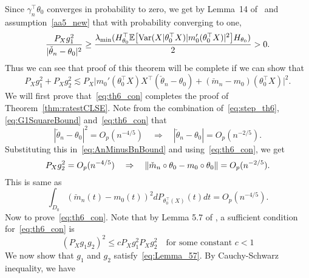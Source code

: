 Since $\gamma_n^{\top}\theta_0$ converges in probability to zero, we get by Lemma~14 of~\cite{Patra16} and assumption~\ref{aa5_new} that with probability converging to one,
\begin{equation}\label{eq:G1SquareBound}
\frac{P_Xg_1^2}{|\check{\theta}_n - \theta_0|^2} \ge \frac{\lambda_{\min}(H_{\theta_0}^\top\mathbb{E}\big[\mathrm{Var}(X|\theta_0^\top X) |m_0'(\theta_0^{\top}X)|^2\big] H_{\theta_0})}{2} > 0.
\end{equation}
Thus we can see that proof of this theorem will be complete if we can show that
\begin{equation}\label{eq:th6_con}
P_X g_1^2 +P_X g_2^2 \lesssim  P_X\big|m_0'(\theta_0^{\top}X)X^{\top}(\check{\theta}_n - \theta_0) + (\check{m}_n - m_0)(\theta_0^{\top}X)\big|^2.
\end{equation}
We will first prove that~\eqref{eq:th6_con} completes the proof of Theorem~\ref{thm:ratestCLSE}. Note from the combination of~\eqref{eq:step_th6}, \eqref{eq:G1SquareBound} and~\eqref{eq:th6_con} that
\[
|\check{\theta}_n - \theta_0|^2 = O_p(n^{-4/5})\quad\Rightarrow\quad |\check{\theta}_n - \theta_0| = O_p(n^{-2/5}).
\]
Substituting this in~\eqref{eq:AnMinusBnBound} and using~\eqref{eq:th6_con}, we get
\[
P_Xg_2^2 = O_p(n^{-4/5})\quad\Rightarrow\quad \left\lVert\check{m}_n\circ\theta_0 - m_0\circ\theta_0\right\rVert = O_p(n^{-2/5}).
\]
This is same as
\begin{equation}\label{eq:IntegralFtheta_0}
\int_{D_0} \left(\check{m}_n(t) - m_0(t)\right)^2dP_{\theta_0^{\top}(X)}(t) dt = O_p(n^{-4/5}).
\end{equation}
Now to prove~\eqref{eq:th6_con}. Note that by Lemma 5.7 of \cite{VANC}, a sufficient condition for~\eqref{eq:th6_con} is 
\begin{equation}\label{eq:Lemma_57}
({P}_Xg_1g_2)^2 \le c{P}_Xg_1^2{P}_Xg_2^2 \quad \text{for some constant }c<1
\end{equation}
We now show that $g_1$ and $g_2$ satisfy~\eqref{eq:Lemma_57}. By Cauchy-Schwarz inequality, we have 
